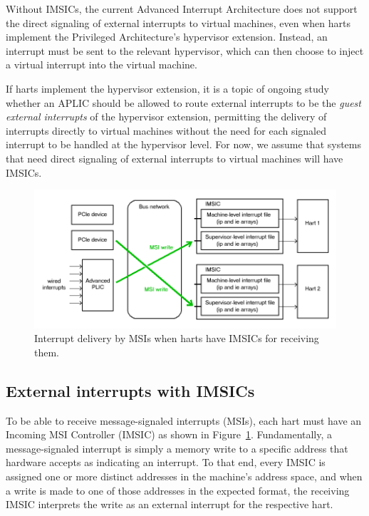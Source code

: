 Without IMSICs, the current Advanced Interrupt Architecture does
not support the direct signaling of external interrupts to virtual
machines, even when {\RISCV} harts implement the Privileged
Architecture's hypervisor extension.
Instead, an interrupt must be sent to the relevant hypervisor, which
can then choose to inject a virtual interrupt into the virtual machine.

\begin{commentary}
If harts implement the hypervisor extension, it is a topic of ongoing
study whether an APLIC should be allowed to route external
interrupts to be the \emph{guest external interrupts} of the hypervisor
extension, permitting the delivery of interrupts directly to virtual
machines without the need for each signaled interrupt to be handled at
the hypervisor level.
For now, we assume that systems that need direct signaling of external
interrupts to virtual machines will have IMSICs.
\end{commentary}

\begin{figure}[th]
\centerline{\includegraphics[scale=0.55]{intrsWithIMSICs.png}}
\caption{%
Interrupt delivery by MSIs when harts have IMSICs for receiving them.%
}
\label{fig:intrsWithIMSICs}
\end{figure}

\FloatBarrier

\subsection{External interrupts with IMSICs}

To be able to receive message-signaled interrupts (MSIs), each
{\RISCV} hart must have an Incoming MSI Controller (IMSIC) as shown in
Figure~\ref{fig:intrsWithIMSICs}.
Fundamentally, a message-signaled interrupt is simply a memory write to
a specific address that hardware accepts as indicating an interrupt.
To that end, every IMSIC is assigned one or more distinct addresses in
the machine's address space, and when a write is made to one of those
addresses in the expected format, the receiving IMSIC interprets the
write as an external interrupt for the respective hart.

